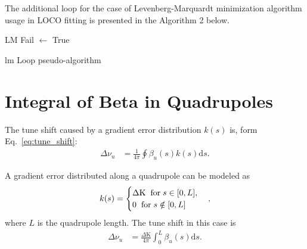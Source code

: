 The additional loop for the case of Levenberg-Marquardt minimization algorithm usage in LOCO fitting is presented in the Algorithm 2 below.
\begin{algorithm}[h!]
\SetAlgoLined
{}
LM Fail $\leftarrow$ True\\
 \caption{\gls{lm} Loop pseudo-algorithm}
 \label{algo:lm_loop}
\end{algorithm}

\chapter{Integral of Beta in Quadrupoles}\label{appendix:beta}
The tune shift caused by a gradient error distribution $k(s)$ is, form Eq.~\eqref{eq:tune_shift}:
\begin{align}
    \Delta\nu_u &= \frac{1}{4\pi} \oint \beta_u(s) k(s) \mathrm{d}s.
\end{align}

A gradient error distributed along a quadrupole can be modeled as
\begin{equation}
    k(s) = 
\begin{cases}
\Delta \mathrm{K} \hspace{0.2cm} \text{for} \hspace{0.1cm} s \in [0, L], \\
0 \hspace{0.2cm} \text{for} \hspace{0.1cm} s \notin [0, L]
\end{cases},
\end{equation}
where $L$ is the quadrupole length. The tune shift in this case is
\begin{align}
    \Delta\nu_u &= \frac{\Delta \mathrm{K}}{4\pi} \int_{0}^{L} \beta_u(s)\mathrm{d}s.
\end{align}

